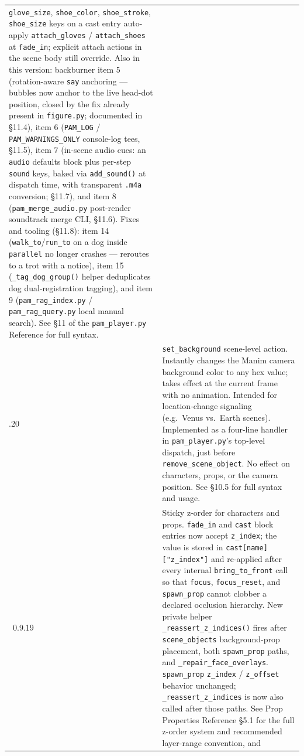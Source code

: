 \documentclass[
  11pt,
]{book}
\begin{document}
\begin{longtable}[]{@{}
  >{\raggedright\arraybackslash}p{}
  >{\raggedright\arraybackslash}p{}@{}}
\texttt{glove\_size}, \texttt{shoe\_color}, \texttt{shoe\_stroke},
\texttt{shoe\_size} keys on a cast entry auto-apply
\texttt{attach\_gloves} / \texttt{attach\_shoes} at \texttt{fade\_in};
explicit attach actions in the scene body still override. Also in this
version: backburner item 5 (rotation-aware \texttt{say} anchoring ---
bubbles now anchor to the live head-dot position, closed by the fix
already present in \texttt{figure.py}; documented in §11.4), item 6
(\texttt{PAM\_LOG} / \texttt{PAM\_WARNINGS\_ONLY} console-log tees,
§11.5), item 7 (in-scene audio cues: an \texttt{audio} defaults block
plus per-step \texttt{sound} keys, baked via \texttt{add\_sound()} at
dispatch time, with transparent \texttt{.m4a} conversion; §11.7), and
item 8 (\texttt{pam\_merge\_audio.py} post-render
soundtrack merge CLI, §11.6). Fixes and tooling (§11.8): item 14
(\texttt{walk\_to}/\texttt{run\_to} on a dog inside \texttt{parallel}
no longer crashes --- reroutes to a trot with a notice), item 15
(\texttt{\_tag\_dog\_group()} helper deduplicates dog dual-registration
tagging), and item 9 (\texttt{pam\_rag\_index.py} /
\texttt{pam\_rag\_query.py} local manual search). See §11 of
the \texttt{pam\_player.py} Reference for full syntax. \\
0.9.20 & \texttt{set\_background} scene-level action. Instantly changes
the Manim camera background color to any hex value; takes effect at the
current frame with no animation. Intended for location-change signaling
(e.g.\ Venus vs.\ Earth scenes). Implemented as a four-line handler in
\texttt{pam\_player.py}'s top-level dispatch, just before
\texttt{remove\_scene\_object}. No effect on characters, props, or the
camera position. See §10.5 for full syntax and usage. \\\
0.9.19 & Sticky z-order for characters and props.
\texttt{fade\_in} and \texttt{cast} block entries now accept
\texttt{z\_index}; the value is stored in \texttt{cast[name]["z\_index"]}
and re-applied after every internal \texttt{bring\_to\_front} call so
that \texttt{focus}, \texttt{focus\_reset}, and \texttt{spawn\_prop}
cannot clobber a declared occlusion hierarchy.
New private helper \texttt{\_reassert\_z\_indices()} fires after
\texttt{scene\_objects} background-prop placement, both
\texttt{spawn\_prop} paths, and \texttt{\_repair\_face\_overlays}.
\texttt{spawn\_prop} \texttt{z\_index} / \texttt{z\_offset} behavior
unchanged; \texttt{\_reassert\_z\_indices} is now also called after those
paths. See Prop Properties Reference §5.1 for the full z-order system
and recommended layer-range convention, and

\end{longtable}
\end{document}
